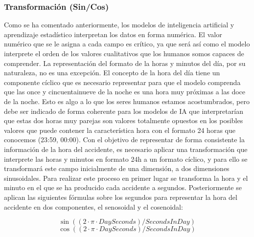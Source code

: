 \documentclass{uathesis-es}
\begin{document}

\subsubsection{Transformación (Sin/Cos)}


Como se ha comentado anteriormente, los modelos de inteligencia artificial y aprendizaje estadístico interpretan los datos en forma numérica. El valor numérico que se le asigna a cada campo es crítico, ya que será así como el modelo interprete el orden de los valores cualitativos que los humanos somos capaces de comprender. La representación del formato de la horas y minutos del día, por su naturaleza, no es una excepción. El concepto de la hora del día tiene un componente cíclico que es necesario representar para que el modelo comprenda que las once y cincuentainueve de la noche es una hora muy próximas a las doce de la noche. Esto es algo a lo que los seres humanos estamos acostumbrados, pero debe ser indicado de forma coherente para los modelos de IA que interpretarían que estas dos horas muy parejas son valores totalmente opuestos en los posibles valores que puede contener la característica hora con el formato 24 horas que conocemos (23:59, 00:00). Con el objetivo de representar de forma consistente la información de la hora del accidente, es necesario aplicar una transformación que interprete las horas y minutos en formato 24h a un formato cíclico, y para ello se transformará este campo inicialmente de una dimensión, a dos dimensiones sinusoidales. Para realizar este proceso en primer lugar se transforma la hora y el minuto en el que se ha producido cada accidente a segundos. Posteriormente se aplican las siguientes fórmulas sobre los segundos para representar la hora del accidente en dos componentes, el senosoidal y el cosenoidal:


\begin{equation}
     \sin((2 \cdot \pi \cdot DaySeconds)/SecondsInDay)
\end{equation}
\begin{equation}
    \cos((2 \cdot \pi \cdot DaySeconds)/SecondsInDay)
\end{equation}

\end{document}
